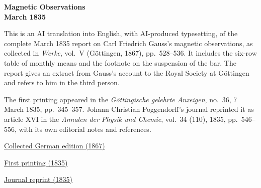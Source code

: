 \clearpage
\thispagestyle{empty}
\begin{center}\Large\textbf{Magnetic Observations\\March 1835}\end{center}

This is an AI translation into English, with AI-produced typesetting, of the complete March 1835 report on Carl Friedrich Gauss’s magnetic observations, as collected in \textit{Werke}, vol.~V (Göttingen, 1867), pp.~528--536. It includes the six-row table of monthly means and the footnote on the suspension of the bar. The report gives an extract from Gauss’s account to the Royal Society at Göttingen and refers to him in the third person.

The first printing appeared in the \textit{Göttingische gelehrte Anzeigen}, no.~36, 7 March 1835, pp.~345--357. Johann Christian Poggendorff’s journal reprinted it as article XVI in the \textit{Annalen der Physik und Chemie}, vol.~34 (110), 1835, pp.~546--556, with its own editorial notes and references.

\medskip\noindent
\href{https://gdz.sub.uni-goettingen.de/id/PPN236006339}{Collected German edition (1867)}\par
\noindent\href{https://www.digitale-sammlungen.de/view/bsb10538708?page=351}{First printing (1835)}\par
\noindent\href{https://www.digitale-sammlungen.de/view/bsb10130347?page=558}{Journal reprint (1835)}
\clearpage
